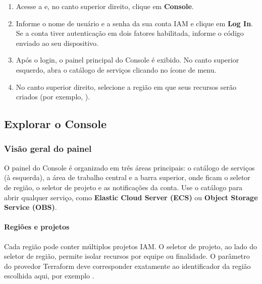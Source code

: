 \documentclass{labguide}
\begin{document}
\passoapasso
\begin{enumerate}
  \item Acesse a 
        e, no canto superior direito, clique em \textbf{Console}.


  \item Informe o nome de usuário e a senha da sua conta IAM e clique em
        \textbf{Log In}. Se a conta tiver autenticação em dois fatores habilitada,
        informe o código enviado ao seu dispositivo.

  \item Após o login, o painel principal do Console é exibido. No canto
        superior esquerdo, abra o catálogo de serviços clicando no ícone de
        menu.


  \item No canto superior direito, selecione a região em que seus recursos
        serão criados (por exemplo, ).

\end{enumerate}

\subsection{Explorar o Console}

\subsubsection{Visão geral do painel}

O painel do Console é organizado em três áreas principais: o catálogo de
serviços (à esquerda), a área de trabalho central e a barra superior, onde
ficam o seletor de região, o seletor de projeto e as notificações da conta.
Use o catálogo para abrir qualquer serviço, como \textbf{Elastic Cloud Server
(ECS)} ou \textbf{Object Storage Service (OBS)}.

\paragraph{Regiões e projetos}
Cada região pode conter múltiplos projetos IAM. O seletor de projeto, ao lado
do seletor de região, permite isolar recursos por equipe ou finalidade. O
parâmetro  do provedor Terraform deve corresponder exatamente ao
identificador da região escolhida aqui, por exemplo .
\end{document}
